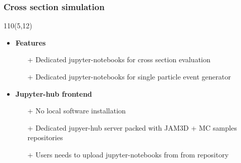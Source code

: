 \begin{frame}
\frametitle{\textbf{Cross section simulation}}
\begin{textblock}{110}(5,12) 
\begin{itemize}
\item \textbf{Features}

  \begin{itemize}
  \item[+] Dedicated jupyter-notebooks for cross section evaluation
  \item[+] Dedicated jupyter-notebooks for single particle event generator
  \end{itemize}

\item \textbf{Jupyter-hub frontend}

  \begin{itemize}
  \item[+] No local software installation
  \item[+] Dedicated jupyer-hub server packed with JAM3D + 
           MC samples repositories 
  \item[+] Users needs to upload jupyter-notebooks from 
           from repository  
  \end{itemize}

\end{itemize}
\end{textblock}
\end{frame}





